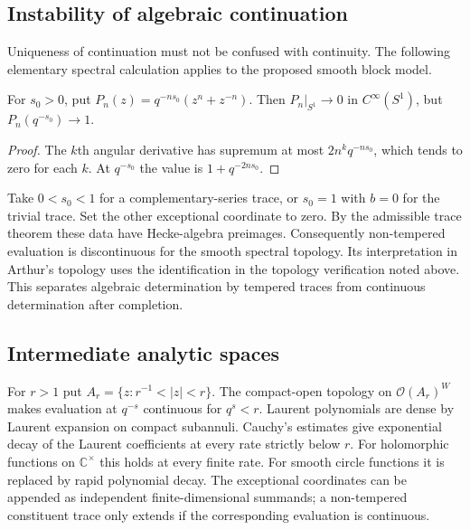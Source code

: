 \subsection{Instability of algebraic continuation}
Uniqueness of continuation must not be confused with continuity. The following elementary spectral calculation applies to the proposed smooth block model.
\begin{theorem}\label{thm:pwinstability}
For $s_0>0$, put $P_n(z)=q^{-ns_0}(z^n+z^{-n})$. Then $P_n|_{S^1}\to0$ in $C^\infty(S^1)$, but $P_n(q^{-s_0})\to1$.
\end{theorem}
\begin{proof}
The $k$th angular derivative has supremum at most $2n^kq^{-ns_0}$, which tends to zero for each $k$. At $q^{-s_0}$ the value is $1+q^{-2ns_0}$.
\end{proof}
Take $0<s_0<1$ for a complementary-series trace, or $s_0=1$ with $b=0$ for the trivial trace. Set the other exceptional coordinate to zero. By the admissible trace theorem these data have Hecke-algebra preimages. Consequently non-tempered evaluation is discontinuous for the smooth spectral topology. Its interpretation in Arthur's topology uses the identification in the topology verification noted above. This separates algebraic determination by tempered traces from continuous determination after completion.

\begin{center}
\end{center}

\subsection{Intermediate analytic spaces}
For $r>1$ put $A_r=\{z:r^{-1}<|z|<r\}$. The compact-open topology on $\mathcal O(A_r)^W$ makes evaluation at $q^{-s}$ continuous for $q^s<r$. Laurent polynomials are dense by Laurent expansion on compact subannuli. Cauchy's estimates give exponential decay of the Laurent coefficients at every rate strictly below $r$. For holomorphic functions on $\mathbb C^\times$ this holds at every finite rate. For smooth circle functions it is replaced by rapid polynomial decay. The exceptional coordinates can be appended as independent finite-dimensional summands; a non-tempered constituent trace only extends if the corresponding evaluation is continuous.

